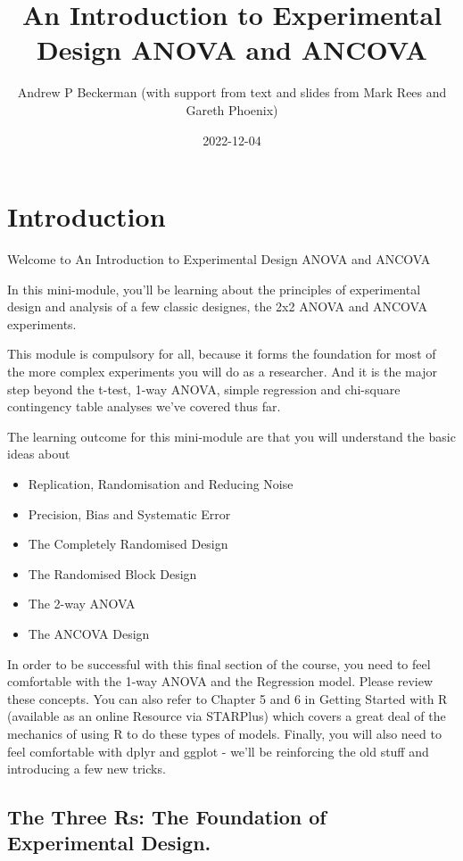 \documentclass[
]{book}
\title{An Introduction to Experimental Design ANOVA and ANCOVA}
\author{Andrew P Beckerman (with support from text and slides from Mark Rees and Gareth Phoenix)}
\date{2022-12-04}
\providecommand{\tightlist}{%
  \setlength{\itemsep}{0pt}\setlength{\parskip}{0pt}}
\begin{document}
\maketitle

{
\setcounter{tocdepth}{1}
\tableofcontents
}
\hypertarget{introduction}{%
\chapter{Introduction}\label{introduction}}

Welcome to An Introduction to Experimental Design ANOVA and ANCOVA

In this mini-module, you'll be learning about the principles of experimental design and analysis of a few classic designes, the 2x2 ANOVA and ANCOVA experiments.

This module is compulsory for all, because it forms the foundation for most of the more complex experiments you will do as a researcher. And it is the major step beyond the t-test, 1-way ANOVA, simple regression and chi-square contingency table analyses we've covered thus far.

The learning outcome for this mini-module are that you will understand the basic ideas about

\begin{itemize}
\tightlist
\item
  Replication, Randomisation and Reducing Noise
\item
  Precision, Bias and Systematic Error
\item
  The Completely Randomised Design
\item
  The Randomised Block Design
\item
  The 2-way ANOVA
\item
  The ANCOVA Design
\end{itemize}

In order to be successful with this final section of the course, you need to feel comfortable with the 1-way ANOVA and the Regression model. Please review these concepts. You can also refer to Chapter 5 and 6 in Getting Started with R (available as an online Resource via STARPlus) which covers a great deal of the mechanics of using R to do these types of models. Finally, you will also need to feel comfortable with dplyr and ggplot - we'll be reinforcing the old stuff and introducing a few new tricks.

\hypertarget{the-three-rs-the-foundation-of-experimental-design.}{%
\section{The Three Rs: The Foundation of Experimental Design.}\label{the-three-rs-the-foundation-of-experimental-design.}}
\end{document}

